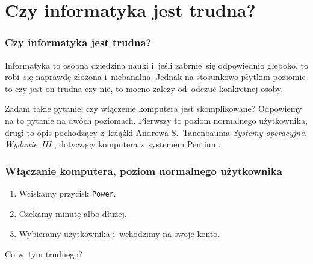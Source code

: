\documentclass[10pt,t]{beamer}
\begin{document}
\section{Czy informatyka jest trudna?}



\begin{frame}
  \frametitle{Czy informatyka jest trudna?}


  Informatyka to osobna dziedzina nauki i~jeśli zabrnie~się odpowiednio
  głęboko, to robi~się naprawdę złożona i~niebanalna. Jednak na stosunkowo
  płytkim poziomie to czy jest on trudna czy nie, to mocno zależy od~odczuć
  konkretnej osoby.

  Zadam takie pytanie: czy włączenie komputera jest skomplikowane?
  Odpowiemy na to pytanie na dwóch poziomach. Pierwszy to poziom normalnego
  użytkownika, drugi to opis pochodzący z~książki Andrewa S.~Tanenbauma
  \textit{Systemy operacyjne. Wydanie~III}
  \parencite{Tannenbaum-Systemy-Operacyjne-Wydanie-III-Pub-2013}, dotyczący
  komputera z~systemem Pentium.

\end{frame}





\begin{frame}
  \frametitle{Włączanie komputera, poziom normalnego użytkownika}


  \begin{enumerate}

  \item Wciskamy przycisk \texttt{Power}.



  \item Czekamy minutę albo dłużej.



  \item Wybieramy użytkownika i~wchodzimy na swoje konto.

  \end{enumerate}

  Co w~tym trudnego?

\end{frame}
\end{document}
